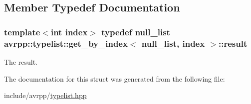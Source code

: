 \subsection{Member Typedef Documentation}
\hypertarget{structavrpp_1_1typelist_1_1get__by__index_3_01null__list_00_01index_01_4_a39059b0b8af3c8d44ba9c1330463e62b}{
\subsubsection[{result}]{\setlength{\rightskip}{0pt plus 5cm}template$<$int index$>$ typedef {\bf null\_\-list} avrpp::typelist::get\_\-by\_\-index$<$ {\bf null\_\-list}, index $>$::{\bf result}}}
\label{structavrpp_1_1typelist_1_1get__by__index_3_01null__list_00_01index_01_4_a39059b0b8af3c8d44ba9c1330463e62b}


The result. 



The documentation for this struct was generated from the following file:\begin{DoxyCompactItemize}
\item 
include/avrpp/\hyperlink{typelist_8hpp}{typelist.hpp}\end{DoxyCompactItemize}

